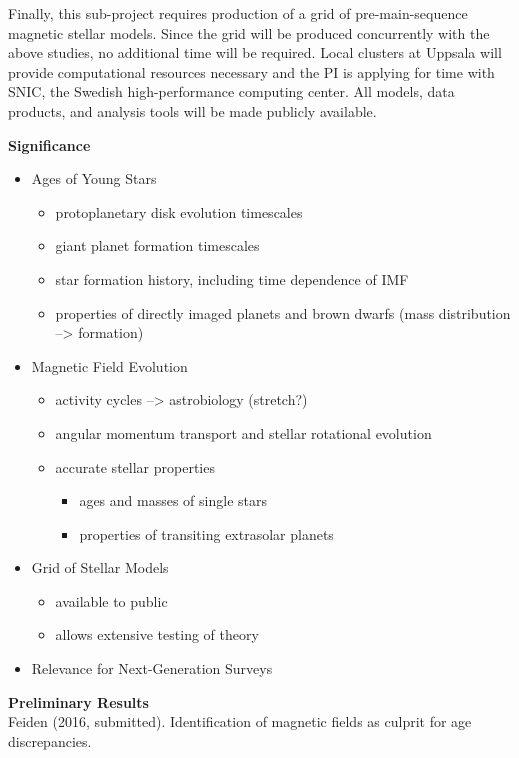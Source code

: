 \documentclass[12pt,a4paper]{article}
\begin{document}
Finally, this sub-project requires production of a grid of pre-main-sequence magnetic stellar models. Since the grid will be produced concurrently with the above studies, no additional time will be required. Local clusters at Uppsala will provide computational resources necessary and the PI is applying for time with SNIC, the Swedish high-performance computing center. All models, data products, and analysis tools will be made publicly available.

\clearpage

{\bf \large Significance}
\begin{itemize}
  \item Ages of Young Stars
  	\begin{itemize}
    	\item protoplanetary disk evolution timescales
    	\item giant planet formation timescales
    	\item star formation history, including time dependence of IMF
    	\item properties of directly imaged planets and brown dwarfs (mass distribution --> formation)
  	\end{itemize}
  \item Magnetic Field Evolution
  	\begin{itemize}
    	\item activity cycles --> astrobiology (stretch?)
    	\item angular momentum transport and stellar rotational evolution
    	\item accurate stellar properties
		\begin{itemize}
      		\item ages and masses of single stars
      		\item properties of transiting extrasolar planets
		\end{itemize}
     \end{itemize}
  \item Grid of Stellar Models
  	\begin{itemize}
		\item available to public
    	\item allows extensive testing of theory
	\end{itemize}
  \item Relevance for Next-Generation Surveys
\end{itemize}

{\bf \large Preliminary Results} \\
Feiden (2016, submitted). Identification of magnetic fields as culprit for age discrepancies.
\end{document}
